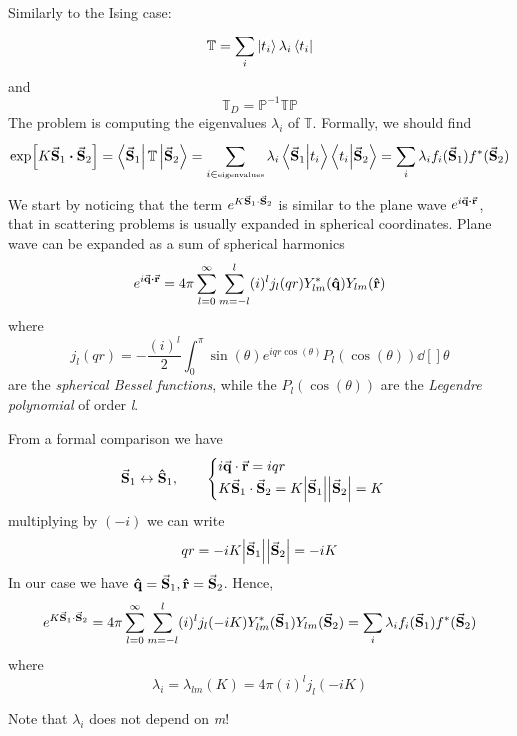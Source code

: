 \documentclass[../main/main.tex]{subfiles}
\begin{document}
Similarly to the Ising case:
\begin{equation}
  \mathbb{T} = \sum_{i}^{} \ket{t_i} \lambda _i \bra{t_i}
\end{equation}
and
\begin{equation}
  \mathbb{T}_D = \mathbb{P}^{-1} \mathbb{T}\mathbb{P}
\end{equation}
The problem is computing the eigenvalues \( \lambda _i \) of \( \mathbb{T} \).
Formally, we should find
\begin{equation}
  \exp [K \va{S}_1\vdot \va{S}_{2}] = \bra{\va{S}_1} \mathbb{T} \ket{\va{S}_2} = \sum_{i \in \text{\tiny eigenvalues}}^{} \lambda _i \braket{\va{S}_1}{t_i}  \braket{t_i}{\va{S}_2}
  = \sum_{i}^{} \lambda _i f_i ( \va{S}_1) f^* (\va{S}_2)
\end{equation}
\begin{remark}
  We start by noticing that the term \( e^{K \va{S}_1 \cdot \va{S}_2}  \) is similar to the plane wave \(e^{i \va{q}\vdot \va{r}}  \), that in scattering problems is usually expanded in spherical coordinates. Plane wave can be expanded as a sum of spherical harmonics
  \begin{equation}
    e^{i \va{q}\vdot \va{r}} = 4 \pi \sum_{l=0}^{\infty } \sum_{m=-l}^{l} (i)^l j_l (qr) Y_{lm}^* (\vu{q}) Y_{lm} (\vu{r})
  \end{equation}
  where
  \begin{equation}
    j_l (qr) = - \frac{(i)^l}{2} \int_{0}^{\pi} \sin(\theta ) e^{i q r \cos(\theta ) } P_l (\cos(\theta ) ) \dd[]{\theta }
  \end{equation}
  are the \emph{spherical Bessel functions}, while  the \( P_l (\cos(\theta ) ) \) are the \emph{Legendre polynomial} of order \emph{l}.
\end{remark}
From a formal comparison we have
  \begin{equation}
    \va{S}_1 \leftrightarrow \vu{S}_1, \qquad
      \begin{cases}
           i \va{q}\cdot \va{r} = iqr \\
           K \va{S}_1 \cdot \va{S}_2 = K \abs{\va{S}_1} \abs{\va{S}_2} = K
      \end{cases}
  \end{equation}
  multiplying by \( (-i) \)  we can write
  \begin{equation}
    qr = -iK \abs{\va{S}_1} \abs{\va{S}_2} = -iK
  \end{equation}
  In our case we have
  \( \vu{q} = \va{S}_1, \vu{r} = \va{S}_2 \). Hence,
  \begin{equation}
    e^{K \va{S}_1 \cdot \va{S}_2} = 4 \pi  \sum_{l=0}^{\infty } \sum_{m=-l}^{l} (i)^l j_l (-iK) Y_{lm}^* (\va{S}_1) Y_{lm} (\va{S}_2) = \sum_{i}^{} \lambda _i f_i (\va{S}_1) f^* (\va{S}_2)
  \end{equation}
where
\begin{equation}
  \lambda _i = \lambda _{lm} (K) = 4 \pi (i)^l j_l (-iK)
\end{equation}
\begin{remark}
Note that \( \lambda _i \) does not depend on \emph{m}!
\end{remark}
\end{document}
